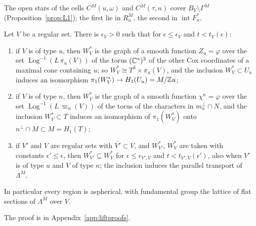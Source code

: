 The open stars of the cells $C^M(u,\omega)$ and $C^M(\tau,n)$ cover $B_Y\setminus\Gamma^M$ (Proposition~\ref{prop:L1}); the
first lie in $R^M_u$, the second in $\operatorname{int}F^*_n$.

\begin{lemma}\label{lem:R1}
Let $V$ be a regular set. There is $\epsilon_V>0$ such that for $\epsilon\le\epsilon_V$ and $t<t_V(\epsilon)$:
\begin{enumerate}
\item if $V$ is of type $u$, then $W^*_V$ is the graph of a smooth function $Z_u=\varphi$ over the set
$\operatorname{Log}^{-1}(L\,\pi_u(V))$ of the torus $(\mathbb C^*)^3$ of the other Cox coordinates of a maximal cone containing $u$;
so $W^*_V\cong T^3\times\pi_u(V)$, and the inclusion $W^*_V\subset U_u$ induces an isomorphism $\pi_1(W^*_V)\to H_1(U_u)=
M/\mathbb Z u$;
\item if $V$ is of type $n$, then $W^*_V$ is the graph of a smooth function $\chi^n=\varphi$ over the set
$\operatorname{Log}^{-1}(L\,\varpi_n(V))$ of the torus of the characters in $m_n^\perp\cap N$, and the inclusion $W^*_V\subset
T$ induces an isomorphism of $\pi_1(W^*_V)$ onto $n^\perp\cap M\subset M=H_1(T)$;
\item if $V'$ and $V$ are regular sets with $\overline{V'}\subset V$, and $W^*_{V'}$, $W^*_V$ are taken with constants
$\epsilon'\le\epsilon$, then $W^*_{V'}\subseteq W^*_V$ for $\epsilon\le\epsilon_{V',V}$ and $t<t_{V',V}(\epsilon')$, also when $V'$
is of type $u$ and $V$ of type $n$; the inclusion induces the parallel transport of $\Lambda^M$.
\end{enumerate}
In particular every region is aspherical, with fundamental group the lattice of flat sections of $\Lambda^M$ over $V$.
\end{lemma}

The proof is in Appendix~\ref{app:liftproofs}.

